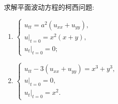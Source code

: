 \begin{exercise}
  求解平面波动方程的柯西问题:
  \begin{enumerate}[(1)]
    \item $\begin{cases}
            u_{tt} = a^2(u_{xx}+u_{yy}), \\
            u|_{t=0}=x^2(x+y), \\
            u_t|_{t=0}=0;
          \end{cases}$
    \item $\begin{cases}
            u_{tt} - 3(u_{xx}+u_{yy}) = x^3+y^3, \\
            u|_{t=0}=0, \\
            u_t|_{t=0}=x^2.
          \end{cases}$
  \end{enumerate}
\end{exercise}

